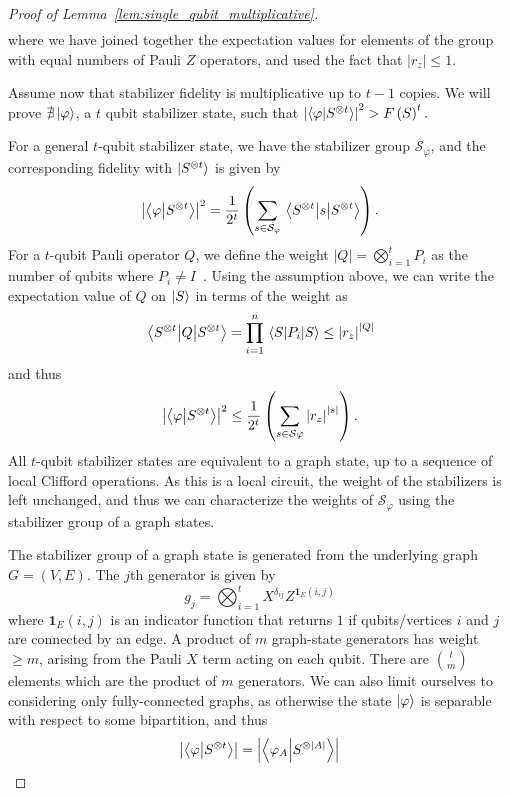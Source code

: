 \begin{proof}[Proof of Lemma~\ref{lem:single_qubit_multiplicative}]
\begin{align}
\label{eq:t_copy_fidelity}
\end{align}
where we have joined together the expectation values for elements of the group with equal numbers of Pauli $Z$ operators, and used the fact that $\left|r_{z}\right|\leq 1$.\par
Assume now that stabilizer fidelity is multiplicative up to $t-1$ copies. We will prove $\nexists \ket{\varphi}$, a $t$ qubit stabilizer state, such that $\left|\braket{\varphi}{S^{\otimes t}}\right|^{2}> F\left(S\right)^{t}.$\par
For a general $t$-qubit stabilizer state, we have the stabilizer group $\mathcal{S}_{\varphi}$, and the corresponding fidelity with $\ket{S^{\otimes t}}$ is given by
\[\left|\braket{\varphi}{S^{\otimes t}}\right|^{2} = \frac{1}{2^{t}} \left( \sum_{s\in\mathcal{S}_{\varphi}}\matrixel{S^{\otimes t}}{s}{S^{\otimes t}} \right).\]
For a $t$-qubit Pauli operator $Q$, we define the weight $\left|Q\right|=\bigotimes_{i=1}^{t}P_{i}$ as the number of qubits where $P_{i}\neq I$~\cite{Gottesman1997}. Using the assumption above, we can write the expectation value of $Q$ on $\ket{S}$ in terms of the weight as
\[\matrixel{S^{\otimes t}}{Q}{S^{\otimes t}} = \prod_{i=1}^{n}\matrixel{S}{P_{i}}{S}\leq \left|r_{z}\right|^{\left|Q\right|}\]
and thus
\[
\left|\braket{\varphi}{S^{\otimes t}}\right|^{2} \leq \frac{1}{2^{t}} \left( \sum_{s\in\mathcal{S}{\varphi}} \left|r_{z}\right|^{\left|s\right|}\right).\]
All $t$-qubit stabilizer states are equivalent to a graph state, up to a sequence of local Clifford operations. As this is a local circuit, the weight of the stabilizers is left unchanged, and thus we can characterize the weights of $\mathcal{S}_{\varphi}$ using the stabilizer group of a graph states.\par
The stabilizer group of a graph state is generated from the underlying graph $G=\left(V,E\right)$. The $j$th generator is given by
\[g_{j} = \bigotimes_{i=1}^{t}X^{\delta_{ij}} Z^{\mathbf{1}_{E}\left(i,j\right)}\]
where $\mathbf{1}_{E}\left(i,j\right)$ is an indicator function that returns $1$ if qubits/vertices $i$ and $j$ are connected by an edge. A product of $m$ graph-state generators has weight $\geq m$, arising from the Pauli $X$ term acting on each qubit. There are $\binom{t}{m}$ elements which are the product of $m$ generators. We can also limit ourselves to considering only fully-connected graphs, as otherwise the state $\ket{\varphi}$ is separable with respect to some bipartition, and thus 
\[
\left|\braket{\varphi}{S^{\otimes t}}\right|
=\left|\braket{\varphi_{A}}{S^{\otimes \left|A\right|}}\right|
\]
\end{proof}

